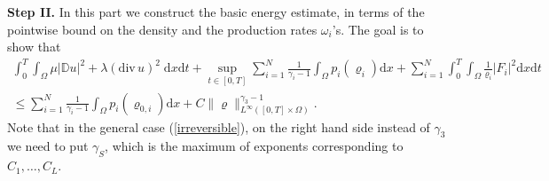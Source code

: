 \documentclass[11pt]{article}
\newcommand{\dd}{\mathrm{d}}
\newcommand{\ddiv}{\mathrm{div\,}}
\newtheorem{lem}[tw]{Lemma}
\numberwithin{equation}{section}
\numberwithin{tw}{section}
\begin{document}

 
 \smallskip 
 
 
 {\bf Step II.} In this part we construct the basic energy estimate, in terms of the pointwise bound on the density and the production rates $\omega_i$'s. The goal is to show that
 \begin{multline}\label{energy} \int_0^T\int_\Omega 
\mu|\mathbb{D} u|^2 +\lambda(\ddiv u)^2\;\dd x\dd t + \sup_{t\in [0,T]}\sum_{i=1}^N\frac{1}{\gamma_i-1}\int_\Omega p_i(\varrho_i)\dd x + \sum_{i=1}^N \int_0^T\int_\Omega \frac{1}{\varrho_i}|F_i|^2 \dd x\dd t \\
\leq \sum_{i=1}^N\frac{1}{\gamma_i-1}\int_\Omega p_i(\varrho_{0,i})\dd x + C\|\varrho\|_{L^\infty([0,T]\times\Omega)}^{\gamma_3-1}. \end{multline}
Note that in the general case (\ref{irreversible}), on the right hand side instead of $\gamma_3$ we need to put $\gamma_S$, which is the maximum of exponents corresponding to $C_1,\dots,C_L$.
\end{document}

